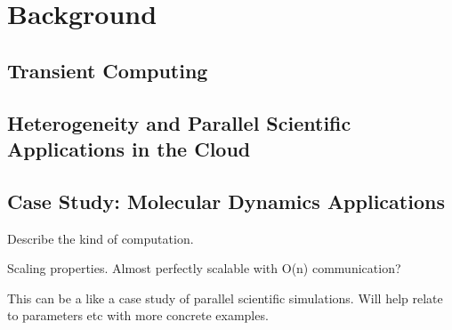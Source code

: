 
\section{Background}

\subsection{Transient Computing}

\subsection{Heterogeneity and Parallel Scientific Applications in the Cloud}

\subsection{Case Study: Molecular Dynamics Applications}
Describe the kind of computation.

Scaling properties. Almost perfectly scalable with O(n) communication? 

This can be a like a case study of parallel scientific simulations.
Will help relate to parameters etc with more concrete examples.






